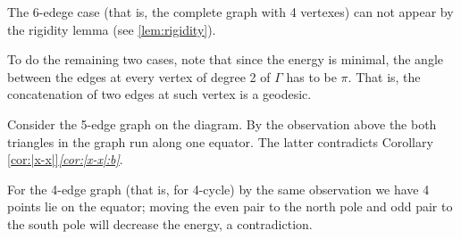 The 6-edege case (that is, the complete graph with 4 vertexes) can not appear by the rigidity lemma (see \ref{lem:rigidity}).

To do the remaining two cases, note that since the energy is minimal, the angle between the edges at every vertex of degree 2 of $\Gamma$ has to be $\pi$. 
That is, the concatenation of two edges at such vertex is a geodesic.

Consider the 5-edge graph on the diagram.
By the observation above the both triangles in the graph run along one equator.
The latter contradicts Corollary \ref{cor:|x-x|}\textit{\ref{cor:|x-x|:b}}.

For the 4-edge graph (that is, for 4-cycle)
by the same observation we have 4 points lie on the equator; 
moving the even pair to the north pole and odd pair to the south pole will decrease the energy, a contradiction.
\qeds
